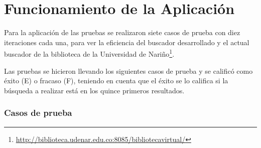 \chapter{Funcionamiento de la Aplicación}

Para la aplicación de las pruebas se realizaron siete casos de prueba con diez iteraciones
cada una, para ver la eficiencia del buscador desarrollado y el actual
buscador de la biblioteca de la Universidad de Nariño\footnote{\url{http://biblioteca.udenar.edu.co:8085/bibliotecavirtual/}}.

Las pruebas se hicieron llevando los siguientes casos de prueba y se calificó
como éxito (E) o fracaso (F), teniendo en cuenta que el éxito se lo califica si
la búsqueda a realizar está en los quince primeros resultados.

\subsection{Casos de prueba}


